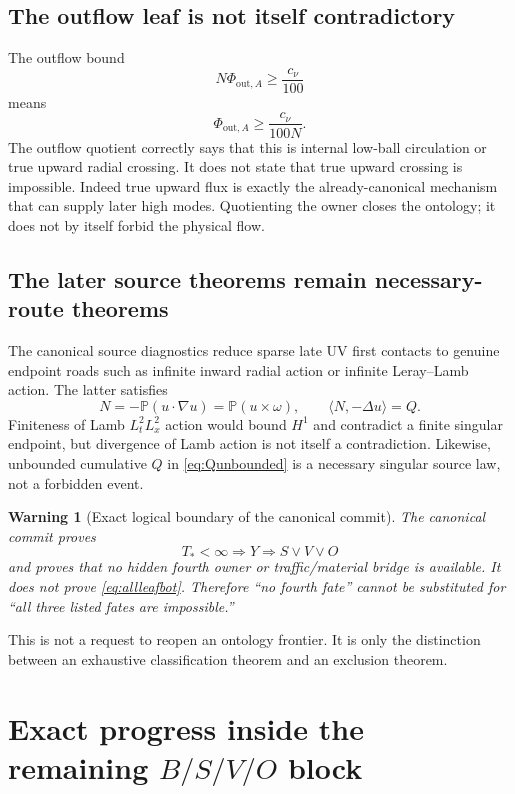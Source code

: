 \documentclass[11pt]{article}
\newtheorem{warning}[theorem]{Warning}
\begin{document}
\subsection{The outflow leaf is not itself contradictory}

The outflow bound
\[
N\Phi_{\mathrm{out},A}\ge\frac{c_\nu}{100}
\]
means
\[
\Phi_{\mathrm{out},A}\ge\frac{c_\nu}{100N}.
\]
The outflow quotient correctly says that this is internal low-ball circulation or true upward radial crossing.  It does not state that true upward crossing is impossible.  Indeed true upward flux is exactly the already-canonical mechanism that can supply later high modes.  Quotienting the owner closes the ontology; it does not by itself forbid the physical flow.

\subsection{The later source theorems remain necessary-route theorems}

The canonical source diagnostics reduce sparse late UV first contacts to genuine endpoint roads such as infinite inward radial action or infinite Leray--Lamb action.  The latter satisfies
\[
N=-\mathbb P(u\cdot\nabla u)=\mathbb P(u\times\omega),
\qquad
\langle N,-\Delta u\rangle=Q.
\]
Finiteness of Lamb $L_t^2L_x^2$ action would bound $H^1$ and contradict a finite singular endpoint, but divergence of Lamb action is not itself a contradiction.  Likewise, unbounded cumulative $Q$ in \eqref{eq:Qunbounded} is a necessary singular source law, not a forbidden event.

\begin{warning}[Exact logical boundary of the canonical commit]\label{warn:boundary}
The canonical commit proves
\[
T_*<\infty\Longrightarrow Y\Longrightarrow S\vee V\vee O
\]
and proves that no hidden fourth owner or traffic/material bridge is available.  It does \emph{not} prove \eqref{eq:allleafbot}.  Therefore ``no fourth fate'' cannot be substituted for ``all three listed fates are impossible.''
\end{warning}

This is not a request to reopen an ontology frontier.  It is only the distinction between an exhaustive classification theorem and an exclusion theorem.


\section{Exact progress inside the remaining $B/S/V/O$ block}
\end{document}
